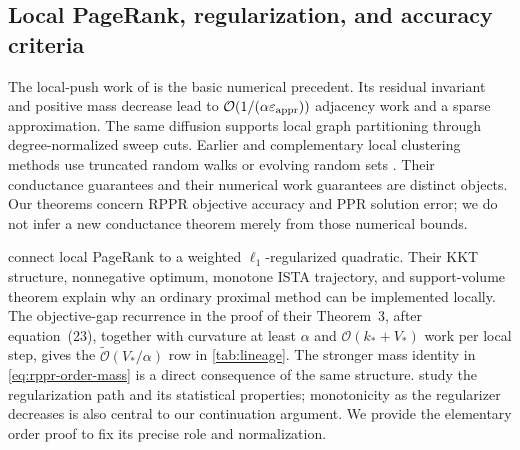 \subsection{Local PageRank, regularization, and accuracy criteria}

The local-push work of \citet{andersen2006local,andersen2007using} is the
basic numerical precedent. Its residual invariant and positive mass decrease
lead to $\mathcal{O}(1/(\alpha\varepsilon_{\mathrm{appr}}))$ adjacency work and a sparse approximation.
The same diffusion supports local graph partitioning through degree-normalized
sweep cuts. Earlier and complementary local clustering methods use truncated
random walks or evolving random sets
\citep{spielman2013local,morris2003evolving,andersen2009finding}.
Their conductance guarantees and their numerical work guarantees are distinct
objects. Our theorems concern RPPR objective accuracy and PPR solution error;
we do not infer a new conductance theorem merely from those numerical bounds.

\citet{fountoulakis2019variational} connect local PageRank to a weighted
$\ell_1$-regularized quadratic. Their KKT structure, nonnegative optimum,
monotone ISTA trajectory, and support-volume theorem explain why an ordinary
proximal method can be implemented locally. The objective-gap recurrence
in the proof of their Theorem~3, after equation~(23), together with
curvature at least $\alpha$ and $\mathcal{O}(k_*+V_*)$ work per local step, gives
the $\widetilde{\mathcal{O}}(V_*/\alpha)$ row in \cref{tab:lineage}.
The stronger mass identity in \cref{eq:rppr-order-mass} is a direct
consequence of the same structure.
\citet[Lemma~4 and Section~5]{ha2021statistical} study the regularization path and its statistical
properties; monotonicity as the regularizer decreases is also central to
our continuation argument. We provide the elementary order proof to fix
its precise role and normalization.

